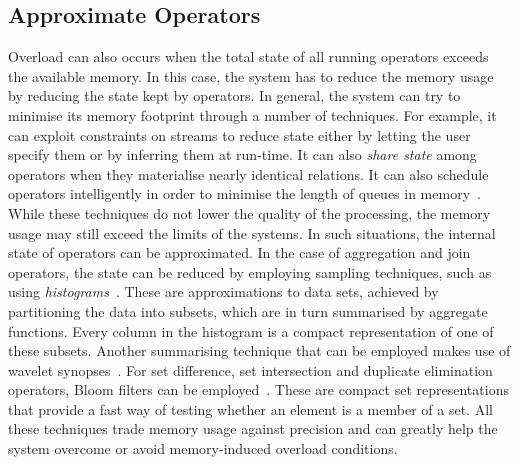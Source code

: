 \subsection*{Approximate Operators} 
Overload can also occurs when the total state of all running operators exceeds the available memory. 
In this case, the system has to reduce the memory usage by reducing the state kept by operators. 
In general, the system can try to minimise its memory footprint through a number
of techniques.
For example, it can exploit constraints on streams to reduce state either by letting the user specify
them or by inferring them at run-time. It can also \emph{share state} among operators when they materialise nearly
identical relations.
It can also schedule operators intelligently in order to minimise the length of queues in
memory~\cite{stream-chains}.
While these techniques do not lower the quality of the processing, the memory usage may still exceed the
limits of the systems. In such situations, the internal state of operators can be approximated. In the
case of aggregation and join operators, the state can be reduced by employing sampling techniques, such
as using \emph{histograms}~\cite{histograms}. These are approximations to data sets, achieved by
partitioning the data into subsets, which are in turn summarised by aggregate functions. Every column in the histogram is a compact
representation of one of these subsets. Another summarising technique that can be employed makes use of
wavelet synopses~\cite{wavelets}. For set difference, set intersection and duplicate
elimination operators, Bloom filters can be employed~\cite{bloom}. These are compact set representations
that provide a fast way of testing whether an element is a member of a set. All these techniques trade
memory usage against precision and can greatly help the system overcome or avoid memory-induced overload
conditions.

